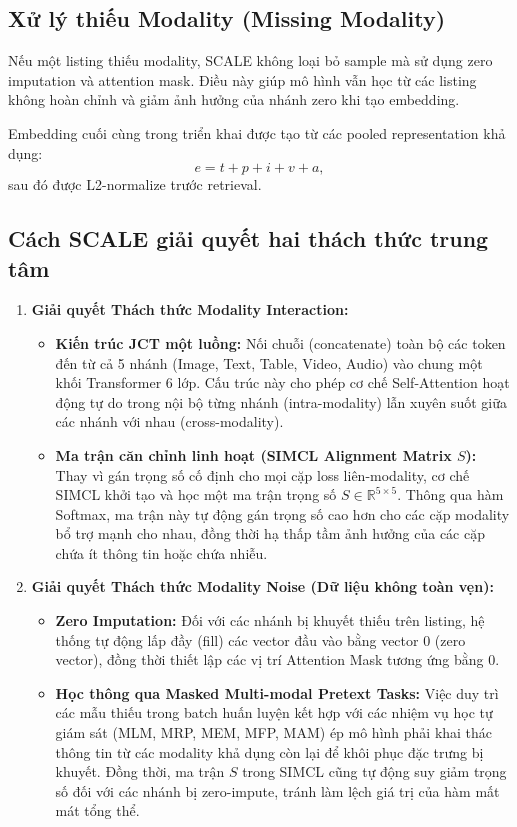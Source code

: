 \documentclass[10pt,conference]{IEEEtran}
\begin{document}
\subsection{Xử lý thiếu Modality (Missing Modality)}

Nếu một listing thiếu modality, SCALE không loại bỏ sample mà sử dụng zero imputation và attention mask. Điều này giúp mô hình vẫn học từ các listing không hoàn chỉnh và giảm ảnh hưởng của nhánh zero khi tạo embedding.

Embedding cuối cùng trong triển khai được tạo từ các pooled representation khả dụng:
\begin{equation}
e=t+p+i+v+a,
\end{equation}
sau đó được L2-normalize trước retrieval.

\subsection{Cách SCALE giải quyết hai thách thức trung tâm}

\begin{enumerate}[leftmargin=*]
    \item \textbf{Giải quyết Thách thức Modality Interaction:}
    \begin{itemize}
        \item \textbf{Kiến trúc JCT một luồng:} Nối chuỗi (concatenate) toàn bộ các token đến từ cả 5 nhánh (Image, Text, Table, Video, Audio) vào chung một khối Transformer 6 lớp. Cấu trúc này cho phép cơ chế Self-Attention hoạt động tự do trong nội bộ từng nhánh (intra-modality) lẫn xuyên suốt giữa các nhánh với nhau (cross-modality).
        \item \textbf{Ma trận căn chỉnh linh hoạt (SIMCL Alignment Matrix $S$):} Thay vì gán trọng số cố định cho mọi cặp loss liên-modality, cơ chế SIMCL khởi tạo và học một ma trận trọng số $S \in \mathbb{R}^{5 \times 5}$. Thông qua hàm Softmax, ma trận này tự động gán trọng số cao hơn cho các cặp modality bổ trợ mạnh cho nhau, đồng thời hạ thấp tầm ảnh hưởng của các cặp chứa ít thông tin hoặc chứa nhiễu.
    \end{itemize}

    \item \textbf{Giải quyết Thách thức Modality Noise (Dữ liệu không toàn vẹn):}
    \begin{itemize}
        \item \textbf{Zero Imputation:} Đối với các nhánh bị khuyết thiếu trên listing, hệ thống tự động lấp đầy (fill) các vector đầu vào bằng vector 0 (zero vector), đồng thời thiết lập các vị trí Attention Mask tương ứng bằng 0.
        \item \textbf{Học thông qua Masked Multi-modal Pretext Tasks:} Việc duy trì các mẫu thiếu trong batch huấn luyện kết hợp với các nhiệm vụ học tự giám sát (MLM, MRP, MEM, MFP, MAM) ép mô hình phải khai thác thông tin từ các modality khả dụng còn lại để khôi phục đặc trưng bị khuyết. Đồng thời, ma trận $S$ trong SIMCL cũng tự động suy giảm trọng số đối với các nhánh bị zero-impute, tránh làm lệch giá trị của hàm mất mát tổng thể.
    \end{itemize}
\end{enumerate}
\end{document}
